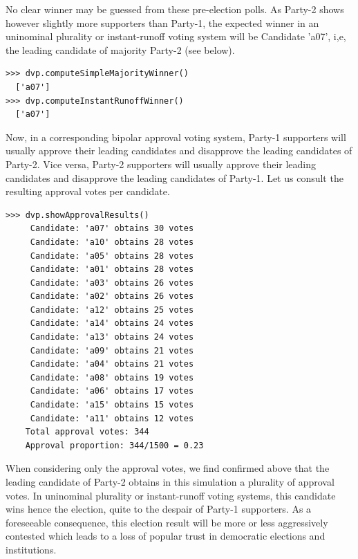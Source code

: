 No clear winner may be guessed from these pre-election polls. As Party-2 shows however slightly more supporters than Party-1, the expected winner in an uninominal plurality or instant-runoff voting system will be Candidate 'a07', i,e, the leading candidate of majority Party-2 (see below).
\begin{lstlisting}
>>> dvp.computeSimpleMajorityWinner()
  ['a07']
>>> dvp.computeInstantRunoffWinner()
  ['a07']
\end{lstlisting}

Now, in a corresponding bipolar approval voting system, Party-1 supporters will usually approve their leading candidates and disapprove the leading candidates of Party-2. Vice versa, Party-2 supporters will usually approve their leading candidates and disapprove the leading candidates of Party-1. Let us consult the resulting approval votes per candidate.
\begin{lstlisting}
>>> dvp.showApprovalResults()
     Candidate: 'a07' obtains 30 votes
     Candidate: 'a10' obtains 28 votes
     Candidate: 'a05' obtains 28 votes
     Candidate: 'a01' obtains 28 votes
     Candidate: 'a03' obtains 26 votes
     Candidate: 'a02' obtains 26 votes
     Candidate: 'a12' obtains 25 votes
     Candidate: 'a14' obtains 24 votes
     Candidate: 'a13' obtains 24 votes
     Candidate: 'a09' obtains 21 votes
     Candidate: 'a04' obtains 21 votes
     Candidate: 'a08' obtains 19 votes
     Candidate: 'a06' obtains 17 votes
     Candidate: 'a15' obtains 15 votes
     Candidate: 'a11' obtains 12 votes
    Total approval votes: 344
    Approval proportion: 344/1500 = 0.23
\end{lstlisting}
When considering only the approval votes, we find confirmed above that the leading candidate of Party-2 obtains in this simulation a plurality of approval votes. In uninominal plurality or instant-runoff voting systems, this candidate wins hence the election, quite to the despair of Party-1 supporters. As a foreseeable consequence, this election result will be more or less aggressively contested which leads to a loss of popular trust in democratic elections and institutions.

